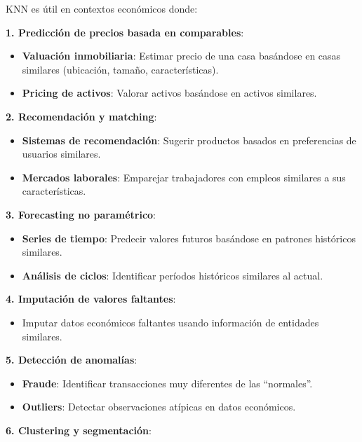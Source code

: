 \documentclass[
  doc,
  floatsintext,
  longtable,
  a4paper,
  nolmodern,
  notxfonts,
  notimes,
  12pt,
  colorlinks=true,linkcolor=blue,citecolor=blue,urlcolor=blue]{apa7}
\providecommand{\tightlist}{%
  \setlength{\itemsep}{0pt}\setlength{\parskip}{0pt}}
\begin{document}
KNN es útil en contextos económicos donde:

\textbf{1. Predicción de precios basada en comparables}:

\begin{itemize}
\tightlist
\item
  \textbf{Valuación inmobiliaria}: Estimar precio de una casa basándose
  en casas similares (ubicación, tamaño, características).
\item
  \textbf{Pricing de activos}: Valorar activos basándose en activos
  similares.
\end{itemize}

\textbf{2. Recomendación y matching}:

\begin{itemize}
\tightlist
\item
  \textbf{Sistemas de recomendación}: Sugerir productos basados en
  preferencias de usuarios similares.
\item
  \textbf{Mercados laborales}: Emparejar trabajadores con empleos
  similares a sus características.
\end{itemize}

\textbf{3. Forecasting no paramétrico}:

\begin{itemize}
\tightlist
\item
  \textbf{Series de tiempo}: Predecir valores futuros basándose en
  patrones históricos similares.
\item
  \textbf{Análisis de ciclos}: Identificar períodos históricos similares
  al actual.
\end{itemize}

\textbf{4. Imputación de valores faltantes}:

\begin{itemize}
\tightlist
\item
  Imputar datos económicos faltantes usando información de entidades
  similares.
\end{itemize}

\textbf{5. Detección de anomalías}:

\begin{itemize}
\tightlist
\item
  \textbf{Fraude}: Identificar transacciones muy diferentes de las
  ``normales''.
\item
  \textbf{Outliers}: Detectar observaciones atípicas en datos
  económicos.
\end{itemize}

\textbf{6. Clustering y segmentación}:
\end{document}
